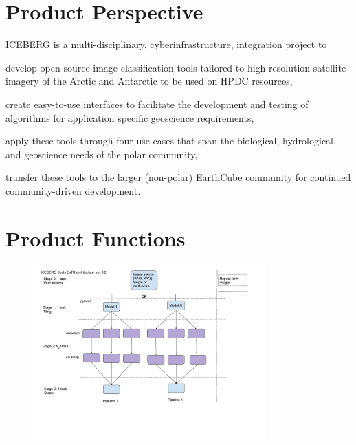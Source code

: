 \documentclass{scrreprt}
\begin{document}
\section{Product Perspective}

ICEBERG is a multi-disciplinary, cyberinfrastructure, integration project to 
\begin{inparaenum}[(1)]
    \item develop open source image classification tools tailored to high-resolution 
	satellite imagery of the Arctic and Antarctic to be used on HPDC resources,
	\item create easy-to-use interfaces to facilitate the development and testing 
	of algorithms for application specific geoscience requirements,
	\item apply these tools through four use cases that span the biological, 
	hydrological, and geoscience needs of the polar community,
	\item transfer these tools to the larger (non-polar) EarthCube community for 
	continued community-driven development.
\end{inparaenum}

\section{Product Functions}

\begin{figure}[H]
 \centering
 \includegraphics[width=0.8\textwidth]{SealsExecutionArchitecture.jpg}
\end{figure}
\end{document}
